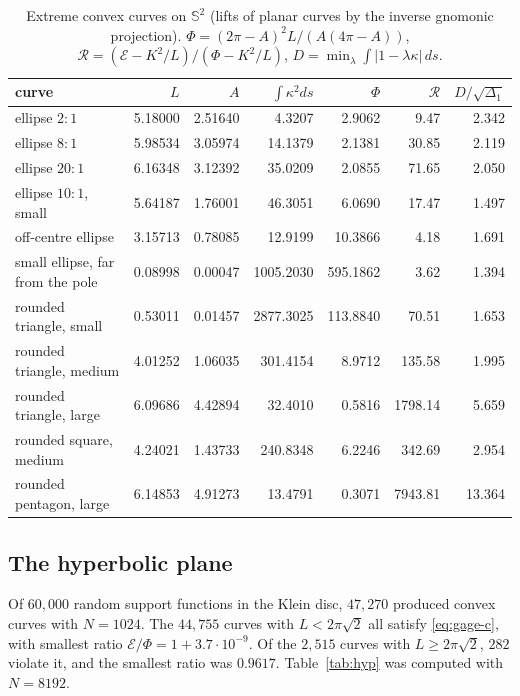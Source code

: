 \documentclass[11pt]{amsart}
\theoremstyle{definition}
\theoremstyle{remark}
\numberwithin{equation}{section}
\newcommand{\Sph}{\mathbb{S}}
\newcommand{\E}{\mathcal{E}}
\begin{document}
\begin{table}[t]
\centering
\small
\caption{Extreme convex curves on $\Sph^2$ (lifts of planar curves by the inverse gnomonic projection). $\Phi=(2\pi-A)^2L/(A(4\pi-A))$, $\mathcal R=(\E-K^2/L)/(\Phi-K^2/L)$, $D=\min_\lambda\int|1-\lambda\kappa|\,ds$.}
\label{tab:sphere}
\begin{tabular}{lrrrrrr}
\toprule
curve & $L$ & $A$ & $\int\kappa^2ds$ & $\Phi$ & $\mathcal R$ & $D/\sqrt{\Delta_1}$\\
\midrule
ellipse $2:1$ & 5.18000 & 2.51640 & 4.3207 & 2.9062 & 9.47 & 2.342\\
ellipse $8:1$ & 5.98534 & 3.05974 & 14.1379 & 2.1381 & 30.85 & 2.119\\
ellipse $20:1$ & 6.16348 & 3.12392 & 35.0209 & 2.0855 & 71.65 & 2.050\\
ellipse $10:1$, small & 5.64187 & 1.76001 & 46.3051 & 6.0690 & 17.47 & 1.497\\
off-centre ellipse & 3.15713 & 0.78085 & 12.9199 & 10.3866 & 4.18 & 1.691\\
small ellipse, far from the pole & 0.08998 & 0.00047 & 1005.2030 & 595.1862 & 3.62 & 1.394\\
rounded triangle, small & 0.53011 & 0.01457 & 2877.3025 & 113.8840 & 70.51 & 1.653\\
rounded triangle, medium & 4.01252 & 1.06035 & 301.4154 & 8.9712 & 135.58 & 1.995\\
rounded triangle, large & 6.09686 & 4.42894 & 32.4010 & 0.5816 & 1798.14 & 5.659\\
rounded square, medium & 4.24021 & 1.43733 & 240.8348 & 6.2246 & 342.69 & 2.954\\
rounded pentagon, large & 6.14853 & 4.91273 & 13.4791 & 0.3071 & 7943.81 & 13.364\\
\bottomrule
\end{tabular}
\end{table}

\subsection{The hyperbolic plane}
Of $60{,}000$ random support functions in the Klein disc, $47{,}270$ produced convex curves with $N=1024$. The $44{,}755$ curves with $L<2\pi\sqrt2$ all satisfy \eqref{eq:gage-c}, with smallest ratio $\E/\Phi=1+3.7\cdot10^{-9}$. Of the $2{,}515$ curves with $L\ge2\pi\sqrt2$, $282$ violate it, and the smallest ratio was $0.9617$. Table~\ref{tab:hyp} was computed with $N=8192$.
\end{document}
